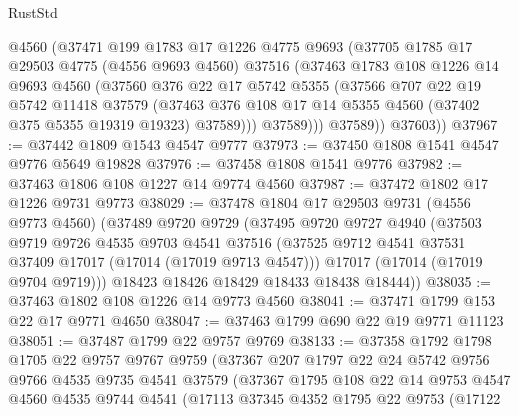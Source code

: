 \begin{lexlean}{RustStd}
\begin{coremodule}
{\begin{coremodule}
{{{{{{{{{{{{{{{{{{{{{{{{{{{{{{{{{{{{{{{{{{{{{{{{{{{{{{{            @4560
            (@37471
              @199
              @1783
              @17
              @1226
              @4775
              @9693
              (@37705
                @1785
                @17
                @29503
                @4775
                (@4556 @9693 @4560)
                @37516
                (@37463
                  @1783
                  @108
                  @1226
                  @14
                  @9693
                  @4560
                  (@37560
                    @376
                    @22
                    @17
                    @5742
                    @5355
                    (@37566
                      @707
                      @22
                      @19
                      @5742
                      @11418
                      @37579
                      (@37463
                        @376
                        @108
                        @17
                        @14
                        @5355
                        @4560
                        (@37402 @375 @5355 @19319 @19323)
                        @37589)))
                  @37589)))
            @37589))
        @37603))
@37967 := @37442 @1809 @1543 @4547 @9777
@37973 := @37450 @1808 @1541 @4547 @9776 @5649 @19828
@37976 := @37458 @1808 @1541 @9776
@37982 := @37463 @1806 @108 @1227 @14 @9774 @4560
@37987 := @37472 @1802 @17 @1226 @9731 @9773
@38029 := @37478
    @1804
    @17
    @29503
    @9731
    (@4556 @9773 @4560)
    (@37489
      @9720
      @9729
      (@37495
        @9720
        @9727
        @4940
        (@37503
          @9719
          @9726
          @4535
          @9703
          @4541
          @37516
          (@37525 @9712 @4541 @37531 @37409 @17017 (@17014 (@17019 @9713 @4547)))
          @17017
          (@17014 (@17019 @9704 @9719)))
        @18423
        @18426
        @18429
        @18433
        @18438
        @18444))
@38035 := @37463 @1802 @108 @1226 @14 @9773 @4560
@38041 := @37471 @1799 @153 @22 @17 @9771 @4650
@38047 := @37463 @1799 @690 @22 @19 @9771 @11123
@38051 := @37487 @1799 @22 @9757 @9769
@38133 := @37358
    @1792
    @1798
    @1705
    @22
    @9757
    @9767
    @9759
    (@37367
      @207
      @1797
      @22
      @24
      @5742
      @9756
      @9766
      @4535
      @9735
      @4541
      @37579
      (@37367
        @1795
        @108
        @22
        @14
        @9753
        @4547
        @4560
        @4535
        @9744
        @4541
        (@17113
          @37345
          @4352
          @1795
          @22
          @9753
          (@17122
}}}}}}}}}}}}}}}}}}}}}}}}}}}}}}}}}}}}}}}}}}}}}}}}}}}}}}}
\end{coremodule}}
\end{coremodule}
\end{lexlean}

